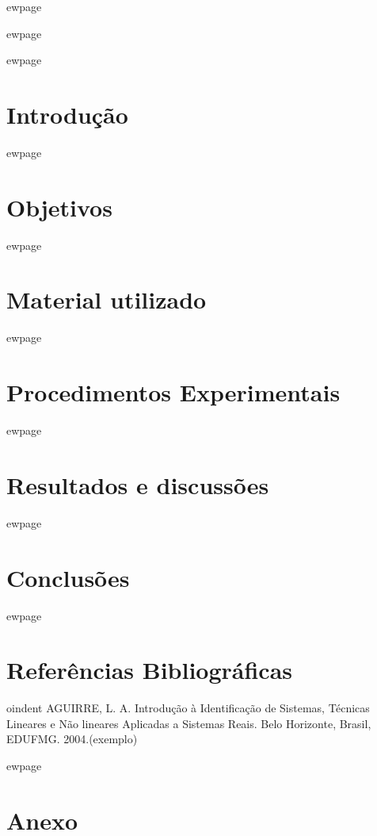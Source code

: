 \documentclass[a4paper, 12pt]{article}
\begin{document}
ewpage

ewpage
\tableofcontents
\thispagestyle{empty}


ewpage
\section{Introdução}

ewpage
\section{Objetivos}

ewpage

\section{Material utilizado}


ewpage
\section{Procedimentos Experimentais}

ewpage
\section{Resultados e discussões}

ewpage

\section{Conclusões}

ewpage

\section*{Referências Bibliográficas}
\footnotesize{


oindent AGUIRRE, L. A. Introdução à Identificação de Sistemas, Técnicas Lineares e Não lineares Aplicadas a Sistemas Reais. Belo Horizonte, Brasil, EDUFMG. 2004.(exemplo)\\

}

ewpage
\section*{Anexo}
\end{document}
